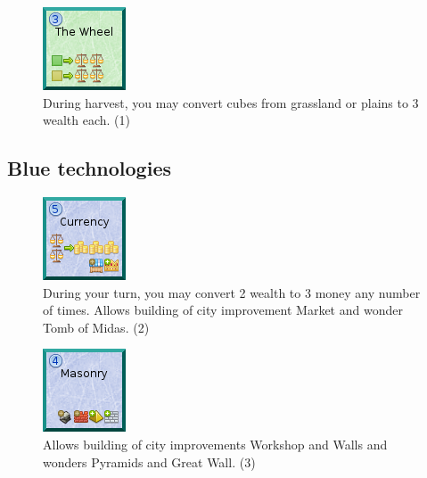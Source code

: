 \documentclass[11pt,a4paper,titlepage]{article}
\begin{document}
{{  \begin{figure}[!htb]
    \begin{minipage}[c]{0.1\textwidth}
      \includegraphics[scale=.7]{doe_tech_wheel.png}
    \end{minipage}\hfill
    \begin{minipage}[c]{0.6\textwidth}
      \captionsetup{labelformat=empty, justification=justified, singlelinecheck=false}
      \caption{During harvest, you may convert cubes from grassland or plains to 3 wealth each. (1)}
    \end{minipage}\hfill
    \label{fig:tech_wheel}
  \end{figure}

  }\label{subsec:green_technologies}
  \newpage
  \subsection{Blue technologies}{

  \begin{figure}[!htb]
    \begin{minipage}[c]{0.1\textwidth}
      \includegraphics[scale=.7]{doe_tech_currency.png}
    \end{minipage}\hfill
    \begin{minipage}[c]{0.6\textwidth}
      \captionsetup{labelformat=empty, justification=justified, singlelinecheck=false}
      \caption{During your turn, you may convert 2 wealth to 3 money any number of times. Allows building of city improvement Market and wonder Tomb of Midas. (2)}
    \end{minipage}\hfill
    \label{fig:tech_currency}
  \end{figure}

  \begin{figure}[!htb]
    \begin{minipage}[c]{0.1\textwidth}
      \includegraphics[scale=.7]{doe_tech_masonry.png}
    \end{minipage}\hfill
    \begin{minipage}[c]{0.6\textwidth}
      \captionsetup{labelformat=empty, justification=justified, singlelinecheck=false}
      \caption{Allows building of city improvements Workshop and Walls and wonders Pyramids and Great Wall. (3)}
    \end{minipage}\hfill
    \label{fig:tech_masonry}
  \end{figure}

}}
\end{document}
